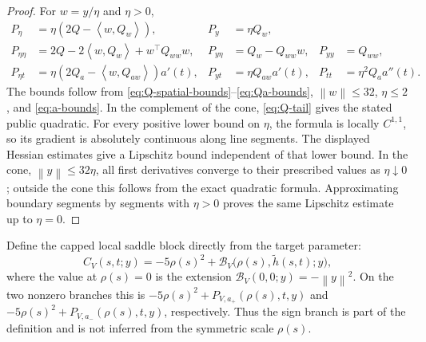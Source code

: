 \documentclass[11pt,a4paper]{article}
\newcommand{\norm}[1]{\left\lVert #1\right\rVert}
\newcommand{\ip}[2]{\left\langle #1,#2\right\rangle}
\theoremstyle{definition}
\theoremstyle{remark}
\numberwithin{equation}{section}
\begin{document}
\begin{proof}
For $w=y/\eta$ and $\eta>0$,
\begin{align*}
 P_\eta&=\eta(2Q-\ip{w}{Q_w}),
 &P_y&=\eta Q_w,\\
 P_{\eta\eta}&=2Q-2\ip{w}{Q_w}+w^\top Q_{ww}w,
 &P_{y\eta}&=Q_w-Q_{ww}w,
 &P_{yy}&=Q_{ww},\\
 P_{\eta t}&=\eta(2Q_a-\ip{w}{Q_{aw}})a'(t),
 &P_{yt}&=\eta Q_{aw}a'(t),
 &P_{tt}&=\eta^2Q_a a''(t).
\end{align*}
The bounds follow from \eqref{eq:Q-spatial-bounds}--\eqref{eq:Qa-bounds},
$\norm w\le32$, $\eta\le2$, and \eqref{eq:a-bounds}.  In the complement of the cone,
\eqref{eq:Q-tail} gives the stated public quadratic.  For every positive lower bound on $\eta$, the formula is locally
$C^{1,1}$, so its gradient is absolutely continuous along line segments.
The displayed Hessian estimates give a Lipschitz bound independent of
that lower bound. In the cone, $\norm y\le32\eta$, all first derivatives
converge to their prescribed values as $\eta\downarrow0$; outside the
cone this follows from the exact quadratic formula. Approximating
boundary segments by segments with $\eta>0$ proves the same Lipschitz
estimate up to $\eta=0$.
\end{proof}

Define the capped local saddle block directly from the target parameter:
\begin{equation}
 C_V(s,t;y)
 =-5\rho(s)^2
  +\mathscr B_V\bigl(\rho(s),\widetilde h(s,t);y\bigr),
 \label{eq:local-block}
\end{equation}
where the value at \(\rho(s)=0\) is the extension
\(\mathscr B_V(0,0;y)=-\norm y^2\).  On the two nonzero branches this is
\(-5\rho(s)^2+P_{V,a_+}(\rho(s),t,y)\) and
\(-5\rho(s)^2+P_{V,a_-}(\rho(s),t,y)\), respectively.  Thus the sign branch is part of the definition and is not inferred from the symmetric scale \(\rho(s)\).
\end{document}
